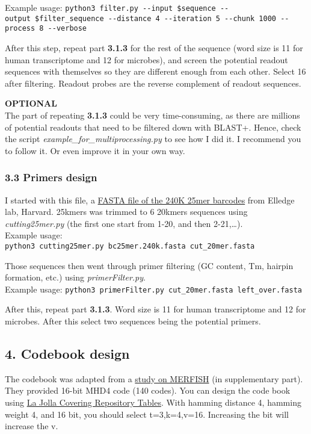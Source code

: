 \documentclass[
]{article}
\begin{document}
Example usage:
\texttt{python3\ filter.py\ -\/-input\ \$sequence\ -\/-output\ \$filter\_sequence\ -\/-distance\ 4\ -\/-iteration\ 5\ -\/-chunk\ 1000\ -\/-process\ 8\ -\/-verbose}

After this step, repeat part \textbf{3.1.3} for the rest of the sequence
(word size is 11 for human transcriptome and 12 for microbes), and
screen the potential readout sequences with themselves so they are
different enough from each other. Select 16 after filtering. Readout
probes are the reverse complement of readout sequences.

\textbf{OPTIONAL}\\
The part of repeating \textbf{3.1.3} could be very time-consuming, as
there are millions of potential readouts that need to be filtered down
with BLAST+. Hence, check the script
\emph{example\_for\_multiprocessing.py} to see how I did it. I recommend
you to follow it. Or even improve it in your own way.

\subsubsection{3.3 Primers design}\label{primers-design}

I started with this file, a
\href{http://elledgelab.med.harvard.edu/wp-content/uploads/2013/07/bc25mer.240k.fasta_.zip}{FASTA
file of the 240K 25mer barcodes} from Elledge lab, Harvard. 25kmers was
trimmed to 6 20kmers sequences using \emph{cutting25mer.py} (the first
one start from 1-20, and then 2-21,\ldots).\\
Example usage:
\texttt{python3\ cutting25mer.py\ bc25mer.240k.fasta\ cut\_20mer.fasta}

Those sequences then went through primer filtering (GC content, Tm,
hairpin formation, etc.) using \emph{primerFilter.py}.\\
Example usage:
\texttt{python3\ primerFilter.py\ cut\_20mer.fasta\ left\_over.fasta}

After this, repeat part \textbf{3.1.3}. Word size is 11 for human
transcriptome and 12 for microbes. After this select two sequences being
the potential primers.

\subsection{4. Codebook design}\label{codebook-design}

The codebook was adapted from a
\href{https://www.science.org/doi/10.1126/science.aaa6090}{study on
MERFISH} (in supplementary part). They provided 16-bit MHD4 code (140
codes). You can design the code book using
\href{https://ljcr.dmgordon.org/cover/table.html}{La Jolla Covering
Repository Tables}. With hamming distance 4, hamming weight 4, and 16
bit, you should select t=3,k=4,v=16. Increasing the bit will increase
the v.
\end{document}

